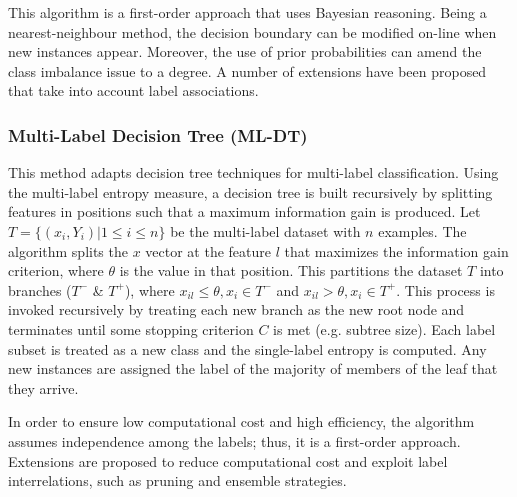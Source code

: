 \documentclass[12pt]{report}
\begin{document}
	This algorithm is a first-order approach that uses Bayesian reasoning. Being a
  nearest-neighbour method, the decision boundary can be modified on-line when
  new instances appear. Moreover, the use of prior probabilities can amend the
  class imbalance issue to a degree. A number of extensions have been proposed that take into account label associations.
	
	\subsubsection*{Multi-Label Decision Tree (ML-DT)}
	This method adapts decision tree techniques for multi-label classification.
  Using the multi-label entropy measure, a decision tree is built recursively by
  splitting features in positions such that a maximum information gain is produced. Let $T = \{(x_i,
  Y_i) | 1 \leq i \leq n \}$ be the multi-label dataset with $n$ examples. The
  algorithm splits the $x$ vector at the feature $l$ that maximizes the
  information gain criterion, where $\theta$ is the value in that position. This
  partitions the dataset $T$ into branches ($T^-$ \& $T^+$), where $x_{il} \leq
  \theta, x_i \in T^-$ and $x_{il} > \theta, x_i \in T^+$. This process is
  invoked recursively by treating each new branch as the new
  root node and terminates until some stopping criterion $C$ is met (e.g.
  subtree size). Each label subset is treated as a new class and the single-label entropy is computed. Any new instances are assigned the label of the majority of members of the leaf that they arrive.
	
	In order to ensure low computational cost and high efficiency, the algorithm
  assumes independence among the labels; thus, it is a first-order approach.
  Extensions are proposed to reduce computational cost and exploit label interrelations, such as pruning and ensemble strategies.
	
\end{document}
